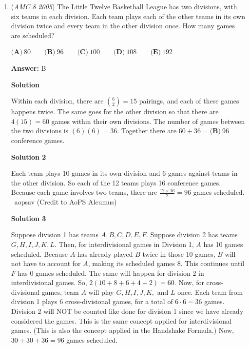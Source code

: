 \begin{enumerate}
Similar to solution 1, $AF + DE = BC$, so $DE=4$. Split the polygon into two rectangles by extending the $DE$ so it intersects $AB$. Let's say the length of $FE$ is equal to $x$. We can form the equation: 
 \[5x + 9(8-x) = 52\]. We see that $x = 5$, so we can add $5 + 4 = \boxed{\textbf{(C)}\ 9}$.

 \begin{verbatim}
- ArjunBhumula
\end{verbatim}




	\item (\textit{AMC 8 2005}) The Little Twelve Basketball League has two divisions, with six teams in each division. Each team plays each of the other teams in its own division twice and every team in the other division once. How many games are scheduled?


 $\textbf{(A)}\ 80\qquad\textbf{(B)}\ 96\qquad\textbf{(C)}\ 100\qquad\textbf{(D)}\ 108\qquad\textbf{(E)}\ 192$

 \textbf{Answer: }B



\textbf{Solution}

Within each division, there are $\binom {6}{2} = 15$ pairings, and each of these games happens twice. The same goes for the other division so that there are $4(15)=60$ games within their own divisions. The number of games between the two divisions is $(6)(6)=36$. Together there are $60+36=\boxed{\textbf{(B)}\ 96}$ conference games.

 



\textbf{Solution 2}

Each team plays 10 games in its own division and 6 games against teams in the other division. So each of the 12 teams plays 16 conference games. Because each game involves two teams, there are $\frac{12\times 16}{2}=\boxed{96}$ games scheduled. ~aopsav (Credit to AoPS Alcumus)

 



\textbf{Solution 3}

Suppose division 1 has teams $A, B, C, D, E, F$. Suppose division 2 has teams $G, H, I, J, K, L$. Then, for interdivisional games in Division 1, $A$ has 10 games scheduled. Because $A$ has already played $B$ twice in those 10 games, $B$ will not have to account for $A$, making its scheduled games 8. This continues until $F$ has 0 games scheduled. The same will happen for division 2 in interdivisional games. So, $2(10 + 8 + 6 + 4 + 2) = 60$. Now, for cross-divisional games, team $A$ will play $G, H, I, J, K,$ and $L$ once. Each team from division 1 plays 6 cross-divisional games, for a total of $6 \cdot 6 = 36$ games. Division 2 will NOT be counted like done for division 1 since we have already considered the games. This is the same concept applied for interdivisional games. (This is also the concept applied in the Handshake Formula.) Now, $30 + 30 + 36 = \boxed{96}$ games scheduled.


\end{enumerate}
